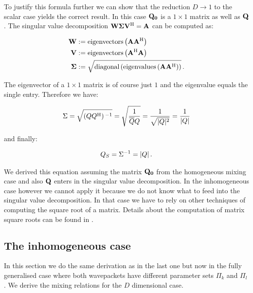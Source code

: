 To justify this formula further we can show that the reduction $D \rightarrow 1$
to the scalar case yields the correct result. In this case $\mathbf{Q_0}$ is a $1 \times 1$
matrix as well as $\mathbf{Q}$. The singular value decomposition $\mathbf{W} \mathbf{\Sigma} \mathbf{V}{}^{\textnormal{H}} = \mathbf{A}$
can be computed as:

\begin{align*}
  \mathbf{W} & := \text{eigenvectors}\left( \mathbf{A} \mathbf{A}{}^{\textnormal{H}} \right) \\
  \mathbf{V} & := \text{eigenvectors}\left( \mathbf{A}{}^{\textnormal{H}} \mathbf{A} \right) \\
  \mathbf{\Sigma} & := \sqrt{\text{diagonal}\left( \text{eigenvalues}\left( \mathbf{A} \mathbf{A}{}^{\textnormal{H}} \right) \right)} \,.
\end{align*}

The eigenvector of a $1 \times 1$ matrix is of course just $1$ and the eigenvalue
equals the single entry. Therefore we have:

\begin{equation*}
  \Sigma = \sqrt{\left( Q Q{}^{\textnormal{H}} \right){}^{-1}} = \sqrt{\frac{1}{\overline{Q}Q}} = \frac{1}{\sqrt{|Q|^2}} = \frac{1}{|Q|}
\end{equation*}

and finally:

\begin{equation*}
  Q_S = \Sigma{}^{-1} = |Q| \,.
\end{equation*}

We derived this equation assuming the matrix $\mathbf{Q_0}$ from the homogeneous mixing
case and also $\mathbf{Q}$ enters in the singular value decomposition. In the inhomogeneous
case however we cannot apply it because we do not know what to feed into the
singular value decomposition. In that case we have to rely on other techniques
of computing the square root of a matrix. Details about the computation of
matrix square roots can be found in \cite{H_functions_of_matrices}.


\subsection{The inhomogeneous case}


In this section we do the same derivation as in the last one but now in the fully
generalised case where both wavepackets have different parameter sets $\Pi_k$
and $\Pi_l$. We derive the mixing relations for the $D$ dimensional case.

